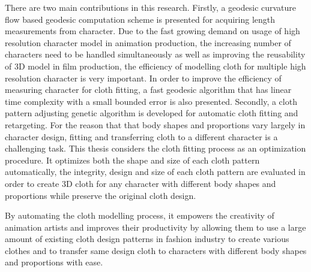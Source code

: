 There are two main contributions in this research. Firstly, a geodesic curvature flow based geodesic computation scheme is presented for acquiring length measurements from character. Due to the fast growing demand on usage of high resolution character model in animation production, the increasing number of characters need to be handled simultaneously as well as improving the reusability of 3D model in film production, the efficiency of modelling cloth for multiple high resolution character is very important. In order to improve the efficiency of measuring character for cloth fitting, a fast geodesic algorithm that has linear time complexity with a small bounded error is also presented. Secondly, a cloth pattern adjusting genetic algorithm is developed for automatic cloth fitting and retargeting. For the reason that that body shapes and proportions vary largely in character design, fitting and transferring cloth to a different character is a challenging task. This thesis considers the cloth fitting process as an optimization procedure. It optimizes both the shape and size of each cloth pattern automatically, the integrity, design and size of each cloth pattern are evaluated in order to create 3D cloth for any character with different body shapes and proportions while preserve the original cloth design.

By automating the cloth modelling process, it empowers the creativity of animation artists and improves their productivity by allowing them to use a large amount of existing cloth design patterns in fashion industry to create various clothes and to transfer same design cloth to characters with different body shapes and proportions with ease. 



\ifx\isEmbedded\undefined


\pagebreak

\fi